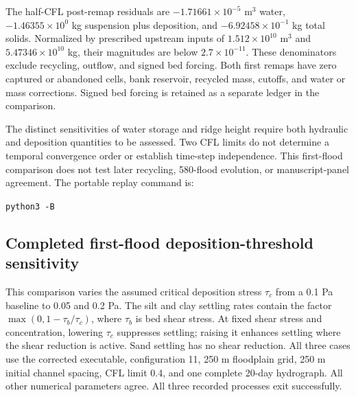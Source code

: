 The half-CFL post-remap residuals are $-1.71661\times10^{-5}$ m$^3$ water,
$-1.46355\times10^{0}$ kg suspension plus deposition, and $-6.92458\times10^{-1}$ kg total solids.
Normalized by prescribed upstream inputs of $1.512\times10^{10}$ m$^3$ and
$5.47346\times10^{10}$ kg, their magnitudes are below $2.7\times10^{-11}$.
These denominators exclude recycling, outflow, and signed bed forcing.
Both first remaps have zero captured or abandoned cells, bank reservoir,
recycled mass, cutoffs, and water or mass corrections. Signed bed
forcing is retained as a separate ledger in the comparison.

The distinct sensitivities of water storage and ridge height require
both hydraulic and deposition quantities to be assessed. Two CFL
limits do not determine a temporal convergence order or establish
time-step independence. This first-flood comparison does not test
later recycling, 580-flood evolution, or manuscript-panel agreement.
The portable replay command is:
\par\noindent\texttt{python3 -B}\ 

\subsection{Completed first-flood deposition-threshold sensitivity}
This comparison varies the assumed critical deposition stress $\tau_c$
from a 0.1 Pa baseline to 0.05 and 0.2 Pa. The silt and clay settling
rates contain the factor $\max(0,1-\tau_b/\tau_c)$, where $\tau_b$
is bed shear stress. At fixed shear stress and concentration, lowering
$\tau_c$ suppresses settling; raising it enhances settling where the
shear reduction is active. Sand settling has no shear reduction.
All three cases use the corrected executable, configuration
11, 250 m floodplain grid, 250 m initial channel spacing, CFL limit
0.4, and one complete 20-day hydrograph. All other numerical parameters
agree. All three recorded processes exit successfully.

